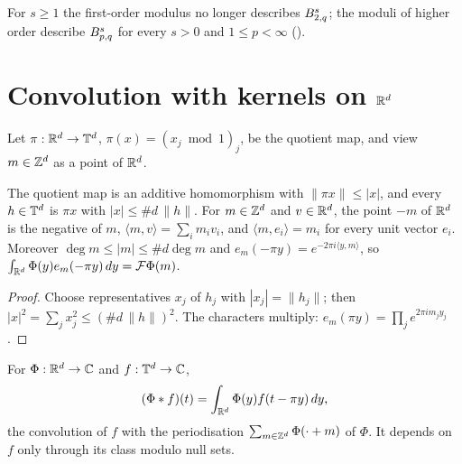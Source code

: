For $s \geq 1$ the first-order modulus no longer describes $B^{s}_{2,q}$; the moduli of
higher order describe $B^{s}_{p,q}$ for every $s > 0$ and $1 \leq p < \infty$
().

\section{Convolution with kernels on \texorpdfstring{$\mathbb{R}^d$}{R\^{}d}}

Let $\pi : \mathbb{R}^d \to \mathbb{T}^d$, $\pi(x) = (x_j \bmod 1)_j$, be the quotient map, and view
$m \in \mathbb{Z}^d$ as a point of $\mathbb{R}^d$.

\begin{lemma}
\label{lem:torus-proj}
\leanok
{}
The quotient map is an additive homomorphism with $\|\pi x\| \leq |x|$, and every $h \in \mathbb{T}^d$ is
$\pi x$ with $|x| \leq \#d \, \|h\|$. For $m \in \mathbb{Z}^d$ and $v \in \mathbb{R}^d$, the point $-m$ of
$\mathbb{R}^d$ is the negative of $m$, $\langle m, v \rangle = \sum_i m_i v_i$, and
$\langle m, e_i \rangle = m_i$ for every unit vector $e_i$. Moreover
$\deg m \leq |m| \leq \#d \deg m$ and $e_m(-\pi y) = e^{-2\pi i \langle y, m \rangle}$, so
$\int_{\mathbb{R}^d} \Phi(y) e_m(-\pi y) \, dy = \mathcal{F}\Phi(m)$.
\end{lemma}

\begin{proof}
\leanok
Choose representatives $x_j$ of $h_j$ with $|x_j| = \|h_j\|$; then
$|x|^2 = \sum_j x_j^2 \leq (\#d \, \|h\|)^2$. The characters multiply:
$e_m(\pi y) = \prod_j e^{2\pi i m_j y_j}$.
\end{proof}

\begin{definition}
\label{def:torus-econv}
\leanok
{}
For $\Phi : \mathbb{R}^d \to \mathbb{C}$ and $f : \mathbb{T}^d \to \mathbb{C}$,
\[
  (\Phi * f)(t) = \int_{\mathbb{R}^d} \Phi(y) f(t - \pi y) \, dy ,
\]
the convolution of $f$ with the periodisation $\sum_{m \in \mathbb{Z}^d} \Phi(\cdot + m)$ of $\Phi$. It
depends on $f$ only through its class modulo null sets.
\end{definition}

